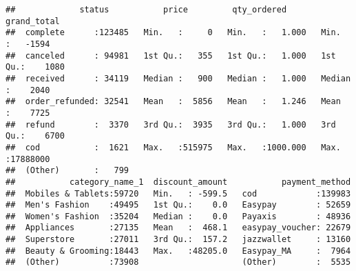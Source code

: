 \documentclass[
]{article}
\newenvironment{Shaded}{\begin{snugshade}}{\end{snugshade}}
\newcommand{\CommentTok}[1]{\textcolor[rgb]{0.56,0.35,0.01}{\textit{#1}}}
\newcommand{\DecValTok}[1]{\textcolor[rgb]{0.00,0.00,0.81}{#1}}
\newcommand{\KeywordTok}[1]{\textcolor[rgb]{0.13,0.29,0.53}{\textbf{#1}}}
\newcommand{\NormalTok}[1]{#1}
\newcommand{\OperatorTok}[1]{\textcolor[rgb]{0.81,0.36,0.00}{\textbf{#1}}}
\newcommand{\StringTok}[1]{\textcolor[rgb]{0.31,0.60,0.02}{#1}}
\begin{document}
\begin{verbatim}
##             status           price         qty_ordered        grand_total      
##  complete      :123485   Min.   :     0   Min.   :   1.000   Min.   :   -1594  
##  canceled      : 94981   1st Qu.:   355   1st Qu.:   1.000   1st Qu.:    1080  
##  received      : 34119   Median :   900   Median :   1.000   Median :    2040  
##  order_refunded: 32541   Mean   :  5856   Mean   :   1.246   Mean   :    7725  
##  refund        :  3370   3rd Qu.:  3935   3rd Qu.:   1.000   3rd Qu.:    6700  
##  cod           :  1621   Max.   :515975   Max.   :1000.000   Max.   :17888000  
##  (Other)       :   799                                                         
##           category_name_1  discount_amount           payment_method  
##  Mobiles & Tablets:59720   Min.   : -599.5   cod            :139983  
##  Men's Fashion    :49495   1st Qu.:    0.0   Easypay        : 52659  
##  Women's Fashion  :35204   Median :    0.0   Payaxis        : 48936  
##  Appliances       :27135   Mean   :  468.1   easypay_voucher: 22679  
##  Superstore       :27011   3rd Qu.:  157.2   jazzwallet     : 13160  
##  Beauty & Grooming:18443   Max.   :48205.0   Easypay_MA     :  7964  
##  (Other)          :73908                     (Other)        :  5535
\end{verbatim}

\begin{Shaded}
\end{Shaded}
\end{document}
